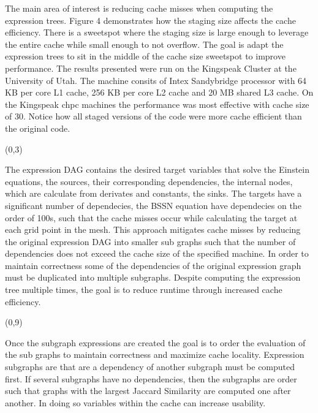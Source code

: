 \documentclass[landscape]{a0poster}
\def\Subhead#1{\noindent{\textbf{\Large\color{DarkBlue} #1}}\medskip}
\begin{document}
\begin{textblock}{30}
\begin{textblock}{14}
\begin{figure}
	\end{figure}

	\vspace{-0.25in}
	The main area of interest is reducing cache misses when computing the expression trees. Figure 4 demonstrates how the staging size affects the cache efficiency. There is a sweetspot where the staging size is large enough to leverage the entire cache while small enough to not overflow. The goal is adapt the expression trees to sit in the middle of the cache size sweetspot to improve performance. The results presented were run on the Kingspeak Cluster at the University of Utah. The machine consits of Intex Sandybridge processor with 64 KB per core L1 cache, 256 KB per core L2 cache and 20 MB shared L3 cache. On the Kingspeak chpc machines the performance was most effective with cache size of 30. Notice how all staged versions of the code were more cache efficient than the original code. 
\end{textblock}


\begin{textblock}{14}(0,3)
	\Subhead{Staging}

	\vspace{-0.25in}
	The expression DAG contains the desired target variables that solve the Einstein equations, the sources, their corresponding dependencies, the internal nodes, which are calculate from derivates and constants, the sinks. The targets have a significant number of dependecies, the BSSN equation have dependecies on the order of 100s, such that the cache misses occur while calculating the target at each grid point in the mesh. This approach mitigates cache misses by reducing the original expression DAG into smaller sub graphs such that the number of dependencies does not exceed the cache size of the specified machine. In order to maintain correctness some of the dependencies of the original expression graph must be duplicated into multiple subgraphs. Despite computing the expression tree multiple times, the goal is to reduce runtime through increased cache efficiency.
	
\end{textblock}

\begin{textblock}{14}(0,9)
	\Subhead{Rebuilding}%

	\vspace{-0.25in}
	Once the subgraph expressions are created the goal is to order the evaluation of the sub graphs to maintain correctness and maximize cache locality. Expression subgraphs are that are a dependency of another subgraph must be computed first. If several subgraphs have no dependencies, then the subgraphs are order such that graphs with the largest Jaccard Similarity are computed one after another. In doing so variables within the cache can increase usability. 
\end{textblock}

\end{textblock}
\end{document}
